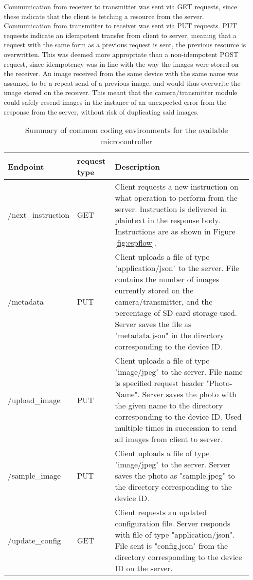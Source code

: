 \documentclass[class=report,11pt,crop=false]{standalone}
\begin{document}
Communication from receiver to transmitter was sent via GET requests, since these indicate that the client is fetching a resource from the server. Communication from transmitter to receiver was sent via PUT requests. PUT requests indicate an idempotent transfer from client to server, meaning that a request with the same form as a previous request is sent, the previous resource is overwritten. This was deemed more appropriate than a non-idempotent POST request, since idempotency was in line with the way the images were stored on the receiver. An image received from the same device with the same name was assumed to be a repeat send of a previous image, and would thus overwrite the image stored on the receiver. This meant that the camera/transmitter module could safely resend images in the instance of an unexpected error from the response from the server, without risk of duplicating said images.

\begin{table}[ht]
    \centering
    \begin{scriptsize}
    \begin{tabularx}{\textwidth}{|p{}|p{}|X|}
    \hline
    \textbf{Endpoint} & \textbf{request type} & \textbf{Description} \\ \hline
    /next\_instruction & GET & Client requests a new instruction on what operation to perform from the server. Instruction is delivered in plaintext in the response body. Instructions are as shown in Figure \ref{fig:espflow}. \\ \hline
    /metadata & PUT & Client uploads a file of type "application/json" to the server. File contains the number of images currently stored on the camera/transmitter, and the percentage of SD card storage used. Server saves the file as "metadata.json" in the directory corresponding to the device ID. \\ \hline
    /upload\_image & PUT & Client uploads a file of type "image/jpeg" to the server. File name is specified request header "Photo-Name". Server saves the photo with the given name to the directory corresponding to the device ID. Used multiple times in succession to send all images from client to server. \\ \hline
    /sample\_image & PUT & Client uploads a file of type "image/jpeg" to the server. Server saves the photo as "sample.jpeg" to the directory corresponding to the device ID. \\ \hline
    /update\_config & GET & Client requests an updated configuration file. Server responds with file of type "application/json". File sent is "config.json" from the directory corresponding to the device ID on the server. \\ \hline
    \end{tabularx}%
    \end{scriptsize}
    \caption{Summary of common coding environments for the available microcontroller}
    \label{tab:server-api}
\end{table}
\end{document}
